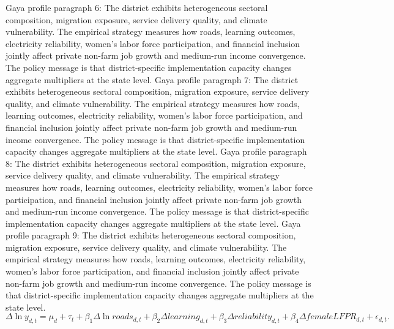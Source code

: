 \documentclass[preprint,12pt]{elsarticle}
\begin{document}
Gaya profile paragraph 6: The district exhibits heterogeneous sectoral composition, migration exposure, service delivery quality, and climate vulnerability. The empirical strategy measures how roads, learning outcomes, electricity reliability, women's labor force participation, and financial inclusion jointly affect private non-farm job growth and medium-run income convergence. The policy message is that district-specific implementation capacity changes aggregate multipliers at the state level.
Gaya profile paragraph 7: The district exhibits heterogeneous sectoral composition, migration exposure, service delivery quality, and climate vulnerability. The empirical strategy measures how roads, learning outcomes, electricity reliability, women's labor force participation, and financial inclusion jointly affect private non-farm job growth and medium-run income convergence. The policy message is that district-specific implementation capacity changes aggregate multipliers at the state level.
Gaya profile paragraph 8: The district exhibits heterogeneous sectoral composition, migration exposure, service delivery quality, and climate vulnerability. The empirical strategy measures how roads, learning outcomes, electricity reliability, women's labor force participation, and financial inclusion jointly affect private non-farm job growth and medium-run income convergence. The policy message is that district-specific implementation capacity changes aggregate multipliers at the state level.
Gaya profile paragraph 9: The district exhibits heterogeneous sectoral composition, migration exposure, service delivery quality, and climate vulnerability. The empirical strategy measures how roads, learning outcomes, electricity reliability, women's labor force participation, and financial inclusion jointly affect private non-farm job growth and medium-run income convergence. The policy message is that district-specific implementation capacity changes aggregate multipliers at the state level.
\begin{equation}\Delta \ln y_{d,t}=\mu_d+\tau_t+\beta_1\Delta\ln roads_{d,t}+\beta_2\Delta learning_{d,t}+\beta_3\Delta reliability_{d,t}+\beta_4\Delta femaleLFPR_{d,t}+\epsilon_{d,t}.\end{equation}
\end{document}
